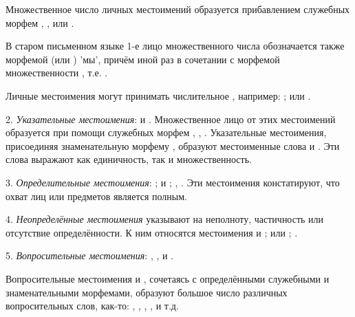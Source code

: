 Множественное число личных местоимений образуется прибавлением служебных морфем , ,  или .

В старом письменном языке 1-е лицо множественного числа обозначается также морфемой	 (или ) 'мы', причём иной раз в сочетании с морфемой множественности , т.е.	.

Личные местоимения могут принимать числительное , например:
;
 или .

2. \emph{Указательные местоимения}:	 и . Множественное лицо от этих местоимений образуется при помощи служебных морфем , , . Указательные местоимения, присоединяя знаменательную морфему , образуют местоименные слова  и . Эти слова выражают как единичность, так и множественность.

3. \emph{Определительные местоимения}: ;  и ; , . Эти местоимения констатируют, что охват лиц или предметов является полным.

4. \emph{Неопределённые местоимения} указывают на неполноту, частичность или отсутствие определённости. К ним относятся местоимения  и ;  или ; .

5. \emph{Вопросительные местоимения}:
, ,  и .

Вопросительные местоимения  и , сочетаясь с определёнными служебными и знаменательными морфемами, образуют большое число различных вопросительных слов, как-то:
,
,
,
,
 и т.д.


